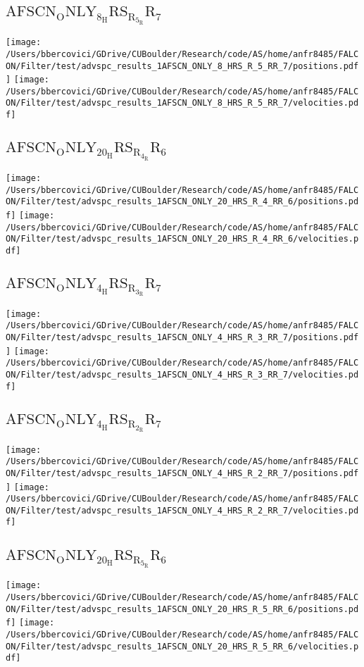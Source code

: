 \subsection{$\mathrm{AFSCN_ONLY_8_HRS_R_5_RR_7}$}
\texttt{[image: /Users/bbercovici/GDrive/CUBoulder/Research/code/AS/home/anfr8485/FALCON/Filter/test/advspc\_results\_1AFSCN\_ONLY\_8\_HRS\_R\_5\_RR\_7/positions.pdf]}
\texttt{[image: /Users/bbercovici/GDrive/CUBoulder/Research/code/AS/home/anfr8485/FALCON/Filter/test/advspc\_results\_1AFSCN\_ONLY\_8\_HRS\_R\_5\_RR\_7/velocities.pdf]}
\subsection{$\mathrm{AFSCN_ONLY_20_HRS_R_4_RR_6}$}
\texttt{[image: /Users/bbercovici/GDrive/CUBoulder/Research/code/AS/home/anfr8485/FALCON/Filter/test/advspc\_results\_1AFSCN\_ONLY\_20\_HRS\_R\_4\_RR\_6/positions.pdf]}
\texttt{[image: /Users/bbercovici/GDrive/CUBoulder/Research/code/AS/home/anfr8485/FALCON/Filter/test/advspc\_results\_1AFSCN\_ONLY\_20\_HRS\_R\_4\_RR\_6/velocities.pdf]}
\subsection{$\mathrm{AFSCN_ONLY_4_HRS_R_3_RR_7}$}
\texttt{[image: /Users/bbercovici/GDrive/CUBoulder/Research/code/AS/home/anfr8485/FALCON/Filter/test/advspc\_results\_1AFSCN\_ONLY\_4\_HRS\_R\_3\_RR\_7/positions.pdf]}
\texttt{[image: /Users/bbercovici/GDrive/CUBoulder/Research/code/AS/home/anfr8485/FALCON/Filter/test/advspc\_results\_1AFSCN\_ONLY\_4\_HRS\_R\_3\_RR\_7/velocities.pdf]}
\subsection{$\mathrm{AFSCN_ONLY_4_HRS_R_2_RR_7}$}
\texttt{[image: /Users/bbercovici/GDrive/CUBoulder/Research/code/AS/home/anfr8485/FALCON/Filter/test/advspc\_results\_1AFSCN\_ONLY\_4\_HRS\_R\_2\_RR\_7/positions.pdf]}
\texttt{[image: /Users/bbercovici/GDrive/CUBoulder/Research/code/AS/home/anfr8485/FALCON/Filter/test/advspc\_results\_1AFSCN\_ONLY\_4\_HRS\_R\_2\_RR\_7/velocities.pdf]}
\subsection{$\mathrm{AFSCN_ONLY_20_HRS_R_5_RR_6}$}
\texttt{[image: /Users/bbercovici/GDrive/CUBoulder/Research/code/AS/home/anfr8485/FALCON/Filter/test/advspc\_results\_1AFSCN\_ONLY\_20\_HRS\_R\_5\_RR\_6/positions.pdf]}
\texttt{[image: /Users/bbercovici/GDrive/CUBoulder/Research/code/AS/home/anfr8485/FALCON/Filter/test/advspc\_results\_1AFSCN\_ONLY\_20\_HRS\_R\_5\_RR\_6/velocities.pdf]}
